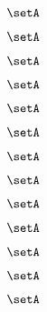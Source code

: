 \begin{forslides}
    \begin{equation}
        \label{eq:systems-170}
        \setA
    \end{equation}

    \begin{equation}
        \label{eq:systems-171}
        \setA
    \end{equation}

    \begin{equation}
        \label{eq:systems-172}
        \setA
    \end{equation}

    \begin{equation}
        \label{eq:systems-173}
        \setA
    \end{equation}

    \begin{equation}
        \label{eq:systems-174}
        \setA
    \end{equation}

    \begin{equation}
        \label{eq:systems-175}
        \setA
    \end{equation}

    \begin{equation}
        \label{eq:systems-176}
        \setA
    \end{equation}

    \begin{equation}
        \label{eq:systems-177}
        \setA
    \end{equation}

    \begin{equation}
        \label{eq:systems-178}
        \setA
    \end{equation}

    \begin{equation}
        \label{eq:systems-179}
        \setA
    \end{equation}

    \begin{equation}
        \label{eq:systems-180}
        \setA
    \end{equation}

    \begin{equation}
        \label{eq:systems-181}
        \setA
    \end{equation}

    \begin{equation}
        \label{eq:systems-182}
        \setA
    \end{equation}


\end{forslides}

